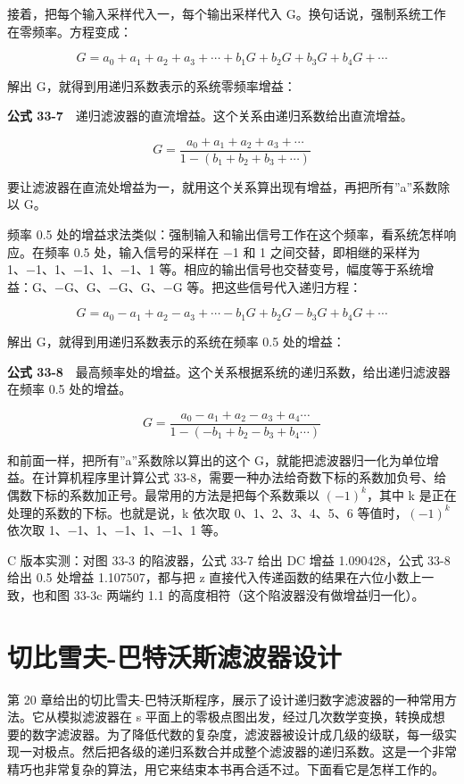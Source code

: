 接着，把每个输入采样代入一，每个输出采样代入
G。换句话说，强制系统工作在零频率。方程变成：

\[G = a_0 + a_1 + a_2 + a_3 + \cdots + b_1G + b_2G + b_3G + b_4G + \cdots\]

解出 G，就得到用递归系数表示的系统零频率增益：

\textbf{公式
33-7}　递归滤波器的直流增益。这个关系由递归系数给出直流增益。

\[G = \frac{a_0 + a_1 + a_2 + a_3 + \cdots}{1 - (b_1 + b_2 + b_3 + \cdots)}\]

要让滤波器在直流处增益为一，就用这个关系算出现有增益，再把所有''a''系数除以
G。

频率 0.5
处的增益求法类似：强制输入和输出信号工作在这个频率，看系统怎样响应。在频率
0.5 处，输入信号的采样在 −1 和 1 之间交替，即相继的采样为
1、−1、1、−1、1、−1、1
等。相应的输出信号也交替变号，幅度等于系统增益：G、−G、G、−G、G、−G
等。把这些信号代入递归方程：

\[G = a_0 - a_1 + a_2 - a_3 + \cdots - b_1G + b_2G - b_3G + b_4G + \cdots\]

解出 G，就得到用递归系数表示的系统在频率 0.5 处的增益：

\textbf{公式
33-8}　最高频率处的增益。这个关系根据系统的递归系数，给出递归滤波器在频率
0.5 处的增益。

\[G = \frac{a_0 - a_1 + a_2 - a_3 + a_4 \cdots}{1 - (-b_1 + b_2 - b_3 + b_4 \cdots)}\]

和前面一样，把所有''a''系数除以算出的这个
G，就能把滤波器归一化为单位增益。在计算机程序里计算公式
33-8，需要一种办法给奇数下标的系数加负号、给偶数下标的系数加正号。最常用的方法是把每个系数乘以
\((-1)^k\)，其中 k 是正在处理的系数的下标。也就是说，k 依次取
0、1、2、3、4、5、6 等值时，\((-1)^k\) 依次取 1、−1、1、−1、1、−1、1
等。

C 版本实测：对图 33-3 的陷波器，公式 33-7 给出 DC 增益 1.090428，公式
33-8 给出 0.5 处增益 1.107507，都与把 z
直接代入传递函数的结果在六位小数上一致，也和图 33-3c 两端约 1.1
的高度相符（这个陷波器没有做增益归一化）。

\section{切比雪夫-巴特沃斯滤波器设计}

第 20
章给出的切比雪夫-巴特沃斯程序，展示了设计递归数字滤波器的一种常用方法。它从模拟滤波器在
s
平面上的零极点图出发，经过几次数学变换，转换成想要的数字滤波器。为了降低代数的复杂度，滤波器被设计成几级的级联，每一级实现一对极点。然后把各级的递归系数合并成整个滤波器的递归系数。这是一个非常精巧也非常复杂的算法，用它来结束本书再合适不过。下面看它是怎样工作的。

